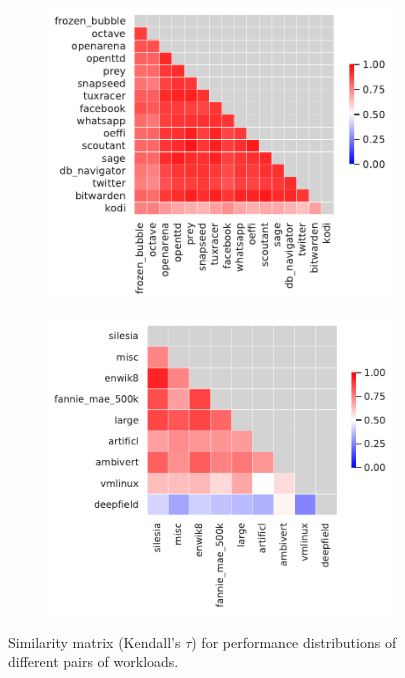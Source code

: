\begin{figure}
\begin{subfigure}{0.33\textwidth}
		\centering
		\includegraphics[width=\linewidth]{images/rq1/kendall_jadx.pdf}
		\caption{\jadx}
	\end{subfigure}
	\begin{subfigure}{0.33\textwidth}
		\centering
		\includegraphics[width=\linewidth]{images/rq1/kendall_kanzi.pdf}
		\caption{\kanzi}
	\end{subfigure}
	\caption{Similarity matrix (Kendall's $\tau$) for performance distributions of different pairs of workloads.}
	\label{fig:diff_performance_similarity}
\end{figure}
\vspace{1em}


